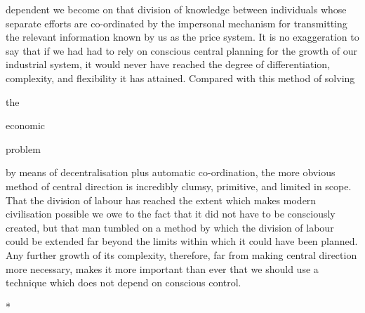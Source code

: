 \documentclass[11pt,openany]{book}
\begin{document}
dependent we become on that division of knowledge between individuals whose separate efforts are co-ordinated by the impersonal mechanism for transmitting the relevant information known by us as the price system. It is no exaggeration to say that if we had had to rely on conscious central planning for the growth of our industrial system, it would never have reached the degree of differentiation, complexity, and flexibility it has attained. Compared with this method of solving

the

economic

problem

by means of decentralisation plus automatic co-ordination, the more obvious method of central direction is incredibly clumsy, primitive, and limited in scope. That the division of labour has reached the extent which makes modern civilisation possible we owe to the fact that it did not have to be consciously created, but that man tumbled on a method by which the division of labour could be extended far beyond the limits within which it could have been planned. Any further growth of its complexity, therefore, far from making central direction more necessary, makes it more important than ever that we should use a technique which does not depend on conscious control.

\begin{center}\textasteriskcentered\hspace{0.9em}\textasteriskcentered\hspace{0.9em}\textasteriskcentered\end{center}

\begin{center}\textasteriskcentered\hspace{0.9em}\textasteriskcentered\hspace{0.9em}\textasteriskcentered\end{center}

\begin{center}\textasteriskcentered\hspace{0.9em}\textasteriskcentered\hspace{0.9em}\textasteriskcentered\end{center}

*
\end{document}
